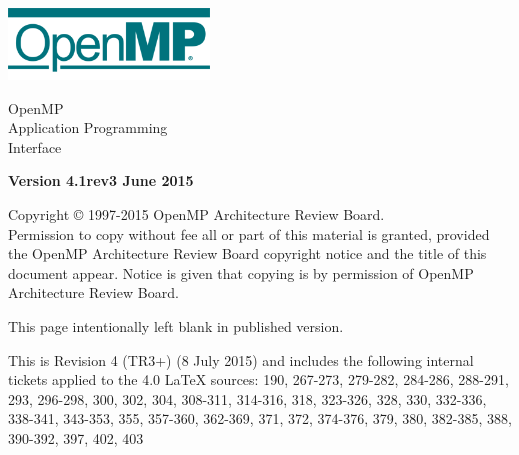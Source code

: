 
  \begin{titlepage}
    \begin{flushleft}
     \hspace{-6em} \includegraphics[width=0.4\textwidth]{openmp-logo.png}
    \end{flushleft}

    \begin{adjustwidth}{-0.75in}{0in}
    \begin{center}
      \Huge
      \textsf{OpenMP\\Application Programming\\Interface}

      \vspace{0.5in}\textsf{    }\vspace{-0.7in}
      \normalsize

      \vspace{1.0in}

      \textbf{Version 4.1rev3 June 2015}
    \end{center}
    \end{adjustwidth}

    \vspace{3.0in}

\begin{adjustwidth}{0pt}{1em}\setlength{\parskip}{0.25\baselineskip}%
Copyright © 1997-2015 OpenMP Architecture Review Board.\\
Permission to copy without fee all or part of this material is granted,
provided the OpenMP Architecture Review Board copyright notice and
the title of this document appear. Notice is given that copying is by
permission of OpenMP Architecture Review Board.\end{adjustwidth}

  \end{titlepage}


\clearpage
\thispagestyle{empty}
\phantom{a}
This page intentionally left blank in published version.

This is Revision 4 (TR3+) (8 July 2015) and includes the following 
internal tickets applied to the 4.0 LaTeX sources: 
190, 267-273, 279-282, 284-286, 288-291, 293, 296-298, 300, 302, 304, 308-311, 
314-316, 318, 323-326, 328, 330, 332-336, 338-341, 343-353, 355, 357-360, 
362-369, 371, 372, 374-376, 379, 380, 382-385, 388, 390-392, 397, 402, 403


\vfill

